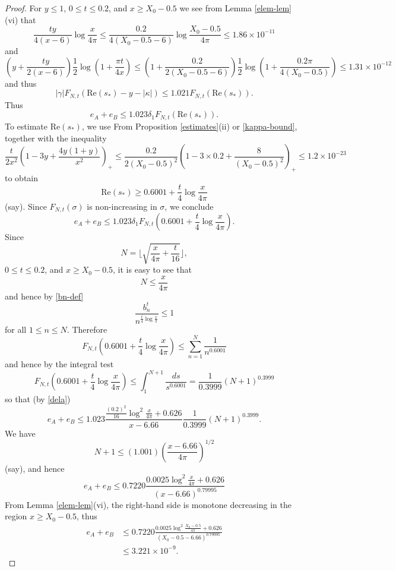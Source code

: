 \begin{proof}
For $y \leq 1$, $0 \leq t \leq 0.2$, and $x \geq X_0 - 0.5$ we see from Lemma \ref{elem-lem}(vi) that
$$ \frac{ty}{4(x-6)} \log \frac{x}{4\pi} \leq \frac{0.2}{4(X_0 - 0.5-6)}\log \frac{X_0 - 0.5}{4\pi} \leq 1.86 \times 10^{-11}$$
and
$$ (y + \frac{ty}{2(x-6)}) \frac{1}{2} \log(1 + \frac{\pi t}{4x}) \leq (1 + \frac{0.2}{2(X_0-0.5-6)}) \frac{1}{2} \log(1 + \frac{0.2 \pi}{4(X_0-0.5)}) \leq 1.31 \times 10^{-12}$$
and thus
\begin{equation}\label{gafn}
 |\gamma| F_{N,t}( \mathrm{Re}(s_*) - y - |\kappa| ) \leq 1.021  F_{N,t}( \mathrm{Re}(s_*) ).
\end{equation}
Thus
$$  e_A + e_B \leq 1.023 \delta_1 F_{N,t}( \mathrm{Re}(s_*) ).$$
To estimate $\mathrm{Re}(s_*)$, we use From Proposition \ref{estimates}(ii) or \eqref{kappa-bound}, together with the inequality
$$ \frac{t}{2x^2} (1-3y+\frac{4y(1+y)}{x^2})_+ \leq \frac{0.2}{2 (X_0-0.5)^2} (1 - 3 \times 0.2 + \frac{8}{(X_0-0.5)^2})_+
\leq 1.2 \times 10^{-23}$$
to obtain 
$$ \mathrm{Re}(s_*) \geq 0.6001 + \frac{t}{4} \log \frac{x}{4\pi}$$
(say).  Since $F_{N,t}(\sigma)$ is non-increasing in $\sigma$, we conclude
$$  e_A + e_B \leq 1.023 \delta_1 F_{N,t}( 0.6001 + \frac{t}{4} \log \frac{x}{4\pi} ).$$
Since
$$ N = \lfloor \sqrt{\frac{x}{4\pi} + \frac{t}{16}} \rfloor,$$
$0 \leq t \leq 0.2$, and $x \geq X_0-0.5$, it is easy to see that
$$ N \leq \frac{x}{4\pi}$$
and hence by \eqref{bn-def}
$$ \frac{b_n^t}{n^{\frac{t}{4} \log \frac{x}{\pi}}} \leq 1$$
for all $1 \leq n \leq N$.  Therefore
$$ F_{N,t}( 0.6001 + \frac{t}{4} \log \frac{x}{4\pi} ) \leq \sum_{n=1}^N \frac{1}{n^{0.6001}}$$
and hence by the integral test
$$ F_{N,t}( 0.6001 + \frac{t}{4} \log \frac{x}{4\pi} ) \leq \int_1^{N+1} \frac{ds}{s^{0.6001}} = \frac{1}{0.3999} (N+1)^{0.3999} $$
so that (by \eqref{dela})
$$ e_A + e_B \leq 1.023 \frac{\frac{(0.2)^2}{16} \log^2 \frac{x}{4\pi} + 0.626}{x-6.66} \frac{1}{0.3999} (N+1)^{0.3999}.$$
We have
$$ N+1 \leq (1.001) (\frac{x-6.66}{4\pi})^{1/2} $$
(say), and hence
$$ e_A + e_B \leq 0.7220 \frac{0.0025 \log^2 \frac{x}{4\pi} + 0.626}{(x-6.66)^{0.79995}}$$
From Lemma \ref{elem-lem}(vi), the right-hand side is monotone decreasing in the region $x \geq X_0-0.5$, thus
\begin{align*}
 e_A + e_B &\leq 0.7220 \frac{0.0025 \log^2 \frac{X_0-0.5}{4\pi} + 0.626}{(X_0-0.5-6.66)^{0.79995}} \\
&\leq 3.221 \times 10^{-9}.
\end{align*}


\end{proof}
